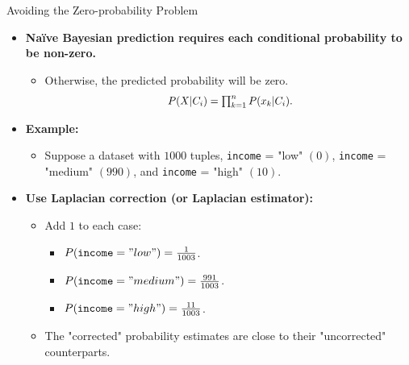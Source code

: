 \begin{frame}{Avoiding the Zero-probability Problem}
	\begin{itemize}
		\item \textbf{Naïve Bayesian prediction requires each conditional probability to be non-zero.}
		      \begin{itemize}
			      \item Otherwise, the predicted probability will be zero.
			            \begin{align}
				            \resizebox{4cm}{!}{
					            $P(X|C_i) = \prod_{k=1}^{n} P(x_k|C_i).$}
			            \end{align}
		      \end{itemize}
		\item \textbf{Example:}
		      \begin{itemize}
			      \item Suppose a dataset with $1000$ tuples, \texttt{income} = "low" $(0)$, \texttt{income} = "medium" $(990)$, and \texttt{income} = "high" $(10)$.
		      \end{itemize}
		\item \textbf{Use {\color{airforceblue}Laplacian correction} (or Laplacian estimator):}
		      \begin{itemize}
			      \item Add $1$ to each case:
			            \begin{itemize}
				            \item $P(\texttt{income} = "low") = \frac{1}{1003}$.
				            \item $P(\texttt{income} = "medium") = \frac{991}{1003}$.
				            \item $P(\texttt{income} = "high") = \frac{11}{1003}$.
			            \end{itemize}
			      \item The "corrected" probability estimates are close to their "uncorrected" counterparts.
		      \end{itemize}
	\end{itemize}
\end{frame}

